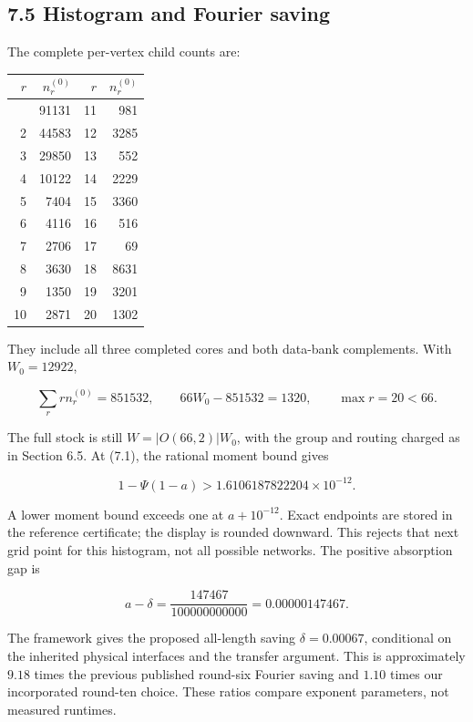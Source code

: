 \documentclass[
  11pt,
]{article}
\newcounter{none} %
\begin{document}

\subsection{7.5 Histogram and Fourier
saving}\label{histogram-and-fourier-saving}

The complete per-vertex child counts are:

{\def\LTcaptype{none} %
\begin{longtable}[]{@{}rrrr@{}}
\toprule\noalign{}
\(r\) & \(n_r^{(0)}\) & \(r\) & \(n_r^{(0)}\) \\
\midrule\noalign{}
\endhead
\bottomrule\noalign{}
\endlastfoot
1 & 91131 & 11 & 981 \\
2 & 44583 & 12 & 3285 \\
3 & 29850 & 13 & 552 \\
4 & 10122 & 14 & 2229 \\
5 & 7404 & 15 & 3360 \\
6 & 4116 & 16 & 516 \\
7 & 2706 & 17 & 69 \\
8 & 3630 & 18 & 8631 \\
9 & 1350 & 19 & 3201 \\
10 & 2871 & 20 & 1302 \\
\end{longtable}
}

They include all three completed cores and both data-bank complements.
With \(W_0=12922\),

\[
\sum_r r n_r^{(0)}=851532,\qquad
66W_0-851532=1320,\qquad\max r=20<66.
\tag{7.3}
\]

The full stock is still \(W=|O(66,2)|W_0\), with the group and routing
charged as in Section 6.5. At (7.1), the rational moment bound gives

\[
1-\Psi(1-a)>1.6106187822204\times10^{-12}.
\]

A lower moment bound exceeds one at \(a+10^{-12}\). Exact endpoints are
stored in the reference certificate; the display is rounded downward.
This rejects that next grid point for this histogram, not all possible
networks. The positive absorption gap is

\[
a-\delta=\frac{147467}{100000000000}=0.00000147467.
\tag{7.4}
\]

The framework gives the proposed all-length saving \(\delta=0.00067\),
conditional on the inherited physical interfaces and the transfer
argument. This is approximately \(9.18\) times the previous published
round-six Fourier saving and \(1.10\) times our incorporated round-ten
choice. These ratios compare exponent parameters, not measured runtimes.
\end{document}
